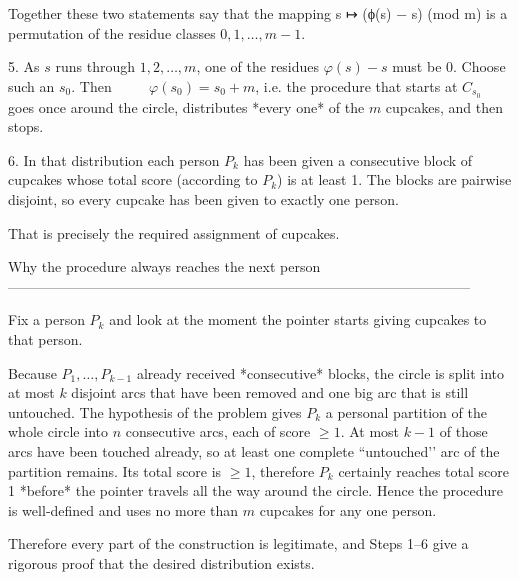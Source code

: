    Together these two statements say that the mapping
      s ↦ (ϕ(s) − s)   (mod m)
   is a permutation of the residue classes
   $0,1,\dots ,m-1$.

5.  As $s$ runs through $1,2,\dots ,m$, one of the residues
   $\varphi(s)-s$ must be $0$.
   Choose such an $s_{0}$.
   Then
          $\varphi(s_{0}) = s_{0}+m$,
   i.e. the procedure that starts at $C_{s_{0}}$
   goes once around the circle, distributes *every one*
   of the $m$ cupcakes, and then stops.

6.  In that distribution each person $P_{k}$ has been given a
   consecutive block of cupcakes whose total score
   (according to $P_{k}$) is at least 1.
   The blocks are pairwise disjoint, so every cupcake has been
   given to exactly one person.

   That is precisely the required assignment of cupcakes.


Why the procedure always reaches the next person  
—————————————————————————————————

Fix a person $P_{k}$ and look at the moment the pointer starts
giving cupcakes to that person.

Because $P_{1},\dots ,P_{k-1}$ already received *consecutive*
blocks, the circle is split into at most $k$ disjoint arcs that
have been removed and one big arc that is still untouched.
The hypothesis of the problem gives $P_{k}$ a personal partition
of the whole circle into $n$ consecutive arcs, each of
score $\ge1$.  At most $k-1$ of those arcs have been touched
already, so at least one complete “untouched’’ arc of the
partition remains.  Its total score is $\ge1$, therefore
$P_{k}$ certainly reaches total score 1 *before* the pointer
travels all the way around the circle.  Hence the procedure
is well‐defined and uses no more than $m$ cupcakes for any one
person.

Therefore every part of the construction is legitimate, and
Steps 1–6 give a rigorous proof that the desired distribution
exists.